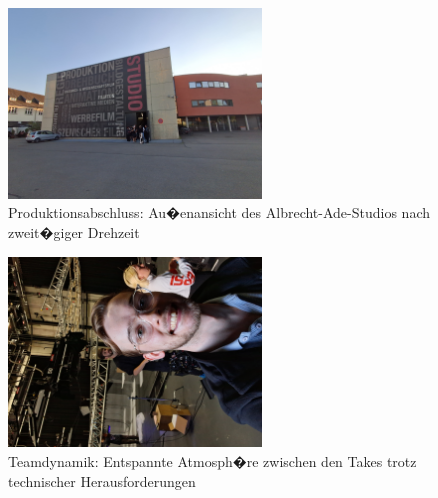 \begin{figure}[!htbp]
   \centering
   \includegraphics[width=0.6\textwidth,height=0.25\textheight,keepaspectratio]{images/onSetImages/WideShotOfOutsideOfStudioAfter2DayShoot.jpg}
   \caption{Produktionsabschluss: Au�enansicht des Albrecht-Ade-Studios nach zweit�giger Drehzeit}
   \label{fig:studio_exterior}
\end{figure}


\begin{figure}[!htbp]
   \centering
   \includegraphics[width=0.6\textwidth,height=0.25\textheight,keepaspectratio]{images/onSetImages/MartySmileyIntoCameraOnSet.jpg}
   \caption{Teamdynamik: Entspannte Atmosph�re zwischen den Takes trotz technischer Herausforderungen}
   \label{fig:team_atmosphere}
\end{figure}

